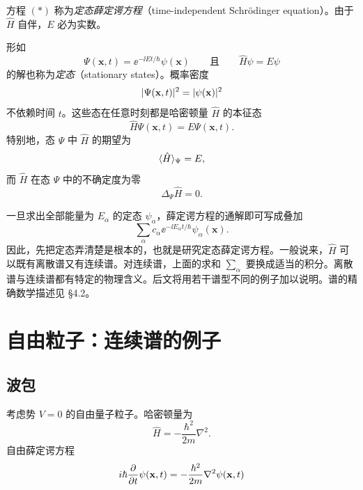 

方程 $(*)$ 称为\emph{定态薛定谔方程}（time-independent Schrödinger equation）。由于 $\hat H$ 自伴，$E$ 必为实数。

形如
\[
\Psi(\mathbf{x},t)=\ee^{-\ii Et/\hbar}\psi(\mathbf{x})
\qquad\text{且}\qquad
\hat H\psi=E\psi
\]
的解也称为\emph{定态}（stationary states）。概率密度
\[
\lvert \Psi(\mathbf{x},t)\rvert^2=\lvert \psi(\mathbf{x})\rvert^2
\]
不依赖时间 $t$。这些态在任意时刻都是哈密顿量 $\hat H$ 的本征态
\[
\hat H\Psi(\mathbf{x},t)=E\Psi(\mathbf{x},t).
\]
特别地，态 $\Psi$ 中 $\hat H$ 的期望为
\[
\langle \hat H\rangle_{\Psi}=E,
\]
而 $\hat H$ 在态 $\Psi$ 中的不确定度为零
\[
\Delta_{\Psi}\hat H=0.
\]

一旦求出全部能量为 $E_{\alpha}$ 的定态 $\psi_{\alpha}$，薛定谔方程的通解即可写成叠加
\[
\sum_{\alpha}c_{\alpha}\ee^{-\ii E_{\alpha}t/\hbar}\psi_{\alpha}(\mathbf{x}).
\]
因此，先把定态弄清楚是根本的，也就是研究定态薛定谔方程。一般说来，$\hat H$ 可以既有离散谱又有连续谱。对连续谱，上面的求和 $\sum_{\alpha}$ 要换成适当的积分。离散谱与连续谱都有特定的物理含义。后文将用若干谱型不同的例子加以说明。谱的精确数学描述见 §4.2。


\section{自由粒子：连续谱的例子}

\subsection{波包}

考虑势 $V=0$ 的自由量子粒子。哈密顿量为
\[
\hat H=-\frac{\hbar^2}{2m}\nabla^2.
\]
自由薛定谔方程
\[
i\hbar\frac{\partial}{\partial t}\psi(\mathbf{x},t)=-\frac{\hbar^2}{2m}\nabla^2\psi(\mathbf{x},t)
\]


